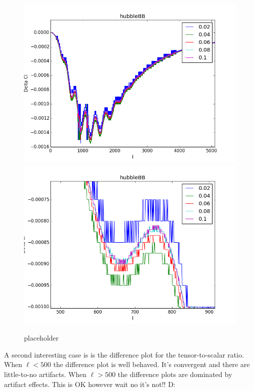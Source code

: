 \begin{figure}
\centering
\includegraphics[scale=0.5]{images/diffs/H0bb.png}
\includegraphics[scale=0.5]{images/diffs/H0bbz.png}
\caption{placeholder}
\end{figure}

A second interesting case is is the difference plot for the tensor-to-scalar ratio. When $\ell < 500$ the difference plot is well behaved. It's convergent and there are little-to-no artifacts. When $\ell > 500$ the difference plots are dominated by artifact effects. This is OK however wait no it's not!! D:

